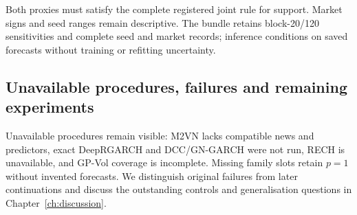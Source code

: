 



\clearpage

\clearpage


Both proxies must satisfy the complete registered joint rule for support. Market signs and seed ranges remain descriptive. The bundle retains block-20/120 sensitivities and complete seed and market records; inference conditions on saved forecasts without training or refitting uncertainty.

\subsection{Unavailable procedures, failures and remaining experiments}

Unavailable procedures remain visible: M2VN lacks compatible news and predictors, exact DeepRGARCH and DCC/GN-GARCH were not run, RECH is unavailable, and GP-Vol coverage is incomplete. Missing family slots retain $p=1$ without invented forecasts. We distinguish original failures from later continuations and discuss the outstanding controls and generalisation questions in Chapter~\ref{ch:discussion}.

\FloatBarrier
